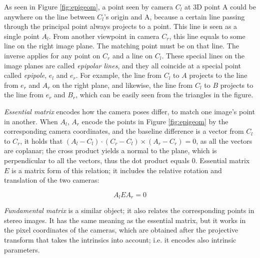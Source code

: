 As seen in Figure \ref{fig:epigeom}, a point seen by camera $C_l$ at 3D point A could be anywhere on the line between $C_l$'s origin and A, because a certain line passing through the principal point always projects to a point.
This line is seen as a single point $A_l$.
From another viewpoint in camera $C_r$, this line equals to some line on the right image plane.
The matching point must be on that line.
The inverse applies for any point on $C_r$ and a line on $C_l$.
These special lines on the image planes are called \emph{epipolar lines}, and they all coincide at a special point called \emph{epipole}, $e_l$ and $e_r$.
For example, the line from $C_l$ to $A$ projects to the line from $e_r$ and $A_r$ on the right plane, and likewise, the line from $C_l$ to $B$ projects to the line from $e_r$ and $B_r$, which can be easily seen from the triangles in the figure.

\emph{Essential matrix} encodes how the camera poses differ, to match one image's point in another.
\cite{hartley03multiview}
When $A_l$, $A_r$ encode the points in Figure \ref{fig:epigeom} by the corresponding camera coordinates, and the baseline difference is a vector from $C_l$ to $C_r$, it holds that $(A_l-C_l) \cdot (C_r - C_l) \times (A_r-C_r) = 0$, as all the vectors are coplanar; the cross product yields a normal to the plane, which is perpendicular to all the vectors, thus the dot product equals 0.
Essential matrix $E$ is a matrix form of this relation; it includes the relative rotation and translation of the two cameras:

\begin{equation} \label{eq:essential}
	A_l E A_r = 0
\end{equation}




\emph{Fundamental matrix} is a similar object; it also relates the corresponding points in stereo images.
It has the same meaning as the essential matrix, but it works in the pixel coordinates of the cameras, which are obtained after the projective transform that takes the intrinsics into account; i.e. it encodes also intrinsic parameters.
\cite[ch. 11]{hartley03multiview}

